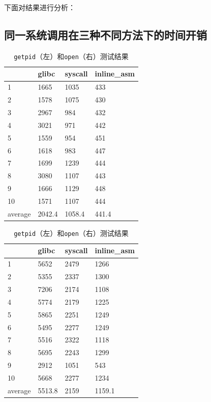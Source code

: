 下面对结果进行分析：

\subsection{同一系统调用在三种不同方法下的时间开销}

\begin{table}[!ht]
    \centering
    \begin{tabular}{|l|l|l|l|}
    \hline
        ~ & glibc & syscall & inline\_asm \\ \hline
        1 & 1665 & 1035 & 433 \\ \hline
        2 & 1578 & 1075 & 430 \\ \hline
        3 & 2967 & 984 & 432 \\ \hline
        4 & 3021 & 971 & 442 \\ \hline
        5 & 1559 & 954 & 451 \\ \hline
        6 & 1618 & 983 & 447 \\ \hline
        7 & 1699 & 1239 & 444 \\ \hline
        8 & 3080 & 1107 & 443 \\ \hline
        9 & 1666 & 1129 & 448 \\ \hline
        10 & 1571 & 1107 & 444 \\ \hline
        average & 2042.4 & 1058.4 & 441.4 \\ \hline
    \end{tabular}
    \hfill
    \begin{tabular}{|l|l|l|l|}
        \hline
            ~ & glibc & syscall & inline\_asm \\ \hline
            1 & 5652 & 2479 & 1266 \\ \hline
            2 & 5355 & 2337 & 1300 \\ \hline
            3 & 7206 & 2174 & 1108 \\ \hline
            4 & 5774 & 2179 & 1225 \\ \hline
            5 & 5865 & 2251 & 1249 \\ \hline
            6 & 5495 & 2277 & 1249 \\ \hline
            7 & 5516 & 2322 & 1118 \\ \hline
            8 & 5695 & 2243 & 1299 \\ \hline
            9 & 2912 & 1051 & 543 \\ \hline
            10 & 5668 & 2277 & 1234 \\ \hline
            average & 5513.8 & 2159 & 1159.1 \\ \hline
        \end{tabular}
    \caption{{\tt getpid}（左）和{\tt open}（右）测试结果}
\end{table}

